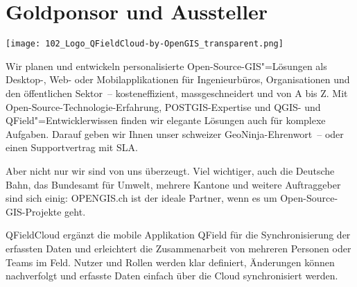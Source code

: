 \section*{Goldponsor und Aussteller}
\begin{center}
  \texttt{[image: 102\_Logo\_QFieldCloud-by-OpenGIS\_transparent.png]}
\end{center}
Wir planen und entwickeln personalisierte Open-Source-GIS"=Lösungen als Desktop-, Web- oder Mobilapplikationen für Ingenieurbüros, Organisationen und den öffentlichen Sektor~-- kosteneffizient, massgeschneidert und von A bis Z. Mit Open-Source-Technologie-Erfahrung, POSTGIS-Expertise und QGIS- und QField"=Entwicklerwissen finden wir elegante Lösungen auch für komplexe Aufgaben. Darauf geben wir Ihnen unser schweizer GeoNinja-Ehrenwort~-- oder einen Supportvertrag mit SLA.

Aber nicht nur wir sind von uns überzeugt. Viel wichtiger, auch die Deutsche Bahn, das Bundesamt für Umwelt, mehrere Kantone und weitere Auftraggeber sind sich einig: OPENGIS.ch ist der ideale Partner, wenn es um Open-Source-GIS-Projekte geht.

QFieldCloud ergänzt die mobile Applikation QField für die Synchronisierung der erfassten Daten und erleichtert die Zusammenarbeit von mehreren Personen oder Teams im Feld. Nutzer und Rollen werden klar definiert, Änderungen können nachverfolgt und erfasste Daten einfach über die Cloud synchronisiert werden.
